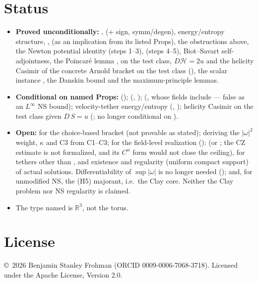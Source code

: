 \documentclass[11pt]{article}
\begin{document}
\section{Status}
\begin{itemize}
\item \textbf{Proved unconditionally:} ,  (+ sign, symm/degen), energy/entropy structure, ,  (as an implication from its listed Props), the obstructions above, the Newton potential identity (steps 1--3),  (steps 4--5), Biot--Savart self-adjointness, the Poincar\'e lemma ,  on the test class, $D\mathcal H=2u$ and the helicity Casimir of the concrete Arnold bracket on the test class (), the scalar instance , the Danskin bound  and the maximum-principle lemmas.
\item \textbf{Conditional on named Props:}  ();  (, );  (, whose fields include  --- false as an $L^\infty$ NS bound); velocity-tether energy/entropy (, ); helicity Casimir on the test class given $D\,S=u$ (; no longer conditional on ).
\item \textbf{Open:}  for the choice-based  bracket (not provable as stated); deriving the $|\omega|^2$ weight, $\kappa$ and C3 from C1--C3; for the field-level realization ():  (or ; the CZ estimate is not formalized, and its $C^\alpha$ form would not close the ceiling),  for tethers other than , and existence and regularity (uniform compact support) of actual solutions. Differentiability of $\sup|\omega|$ is no longer needed (); and, for unmodified NS, the (H5) majorant, i.e.\ the Clay core. Neither the Clay problem nor NS regularity is claimed.
\item The type named  is $\mathbb{R}^3$, not the torus.
\end{itemize}
\section*{License}
\copyright\ 2026 Benjamin Stanley Frohman (ORCID 0009-0006-7068-3718). Licensed under the Apache License, Version 2.0.


\end{document}
